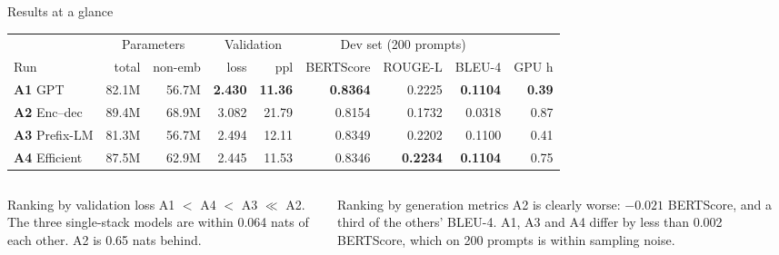 \documentclass[aspectratio=169,11pt]{beamer}
\newcommand{\best}[1]{\textbf{#1}}
\begin{document}
\begin{frame}{Results at a glance}
  \centering\small
  \begin{tabular}{@{}lrrrrrrrr@{}}
    \toprule
    & \multicolumn{2}{c}{Parameters} & \multicolumn{2}{c}{Validation} & \multicolumn{3}{c}{Dev set (200 prompts)} & \\
    \cmidrule(lr){2-3}\cmidrule(lr){4-5}\cmidrule(lr){6-8}
    Run & total & non-emb & loss & ppl & BERTScore & ROUGE-L & BLEU-4 & GPU h\\
    \midrule
    \textcolor{cA1}{\textbf{A1}} GPT       & 82.1M & 56.7M & \best{2.430} & \best{11.36} & \best{0.8364} & 0.2225 & \best{0.1104} & \best{0.39}\\
    \textcolor{cA2}{\textbf{A2}} Enc--dec  & 89.4M & 68.9M & 3.082 & 21.79 & 0.8154 & 0.1732 & 0.0318 & 0.87\\
    \textcolor{cA3}{\textbf{A3}} Prefix-LM & 81.3M & 56.7M & 2.494 & 12.11 & 0.8349 & 0.2202 & 0.1100 & 0.41\\
    \textcolor{cA4}{\textbf{A4}} Efficient & 87.5M & 62.9M & 2.445 & 11.53 & 0.8346 & \best{0.2234} & \best{0.1104} & 0.75\\
    \bottomrule
  \end{tabular}

  \vspace{4mm}
  \begin{columns}[T]
    \begin{column}{0.47\textwidth}
      \begin{block}{Ranking by validation loss}
        \small A1 $<$ A4 $<$ A3 $\ll$ A2.
        The three single-stack models are within 0.064 nats of each other.
        A2 is 0.65 nats behind.
      \end{block}
    \end{column}
    \begin{column}{0.47\textwidth}
      \begin{alertblock}{Ranking by generation metrics}
        \small A2 is clearly worse: $-0.021$ BERTScore, and a third of the others' BLEU-4.
        A1, A3 and A4 differ by less than 0.002 BERTScore, which on 200 prompts is within sampling noise.
      \end{alertblock}
    \end{column}
  \end{columns}
\end{frame}
\end{document}
